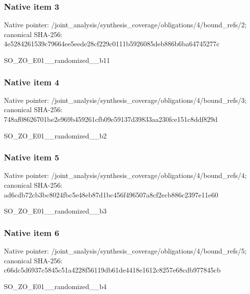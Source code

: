 \documentclass[10pt,a4paper]{article}
\begin{document}
\subsubsection{Native item 3}
Native pointer: /joint\_\allowbreak{}analysis/synthesis\_\allowbreak{}coverage/obligations/4/bound\_\allowbreak{}refs/2; canonical SHA-256: 4e5284261539c79664ee5eede28cf229c0111b5926085deb886b6ba64745277c

\begingroup\raggedright\sloppy SO\_\allowbreak{}ZO\_\allowbreak{}E01\_\allowbreak{}\_\allowbreak{}randomized\_\allowbreak{}\_\allowbreak{}b11\par\endgroup

\subsubsection{Native item 4}
Native pointer: /joint\_\allowbreak{}analysis/synthesis\_\allowbreak{}coverage/obligations/4/bound\_\allowbreak{}refs/3; canonical SHA-256: 748af08626701be2e969b459261cfb09e59137d39833aa230fce151c8ddf829d

\begingroup\raggedright\sloppy SO\_\allowbreak{}ZO\_\allowbreak{}E01\_\allowbreak{}\_\allowbreak{}randomized\_\allowbreak{}\_\allowbreak{}b2\par\endgroup

\subsubsection{Native item 5}
Native pointer: /joint\_\allowbreak{}analysis/synthesis\_\allowbreak{}coverage/obligations/4/bound\_\allowbreak{}refs/4; canonical SHA-256: ad6cdb72cb3bc8024fbc5e48eb87d1bc456f496507a8cf2ecb886c2397e11e60

\begingroup\raggedright\sloppy SO\_\allowbreak{}ZO\_\allowbreak{}E01\_\allowbreak{}\_\allowbreak{}randomized\_\allowbreak{}\_\allowbreak{}b3\par\endgroup

\subsubsection{Native item 6}
Native pointer: /joint\_\allowbreak{}analysis/synthesis\_\allowbreak{}coverage/obligations/4/bound\_\allowbreak{}refs/5; canonical SHA-256: c66dc5d6937c5845c51a4228f56119db61de4418e1612c8257e68cdb977845cb

\begingroup\raggedright\sloppy SO\_\allowbreak{}ZO\_\allowbreak{}E01\_\allowbreak{}\_\allowbreak{}randomized\_\allowbreak{}\_\allowbreak{}b4\par\endgroup
\end{document}
